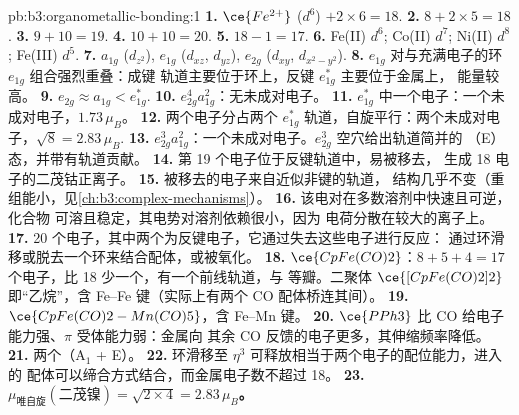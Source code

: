 \begin{solution}{pb:b3:organometallic-bonding:1}
\textbf{1.} $\ce{Fe^{2+}}$ ($d^6$) $+ 2 \times 6 = 18$.
\textbf{2.} $8 + 2 \times 5 = 18$.
\textbf{3.} $9 + 10 = 19$.
\textbf{4.} $10 + 10 = 20$.
\textbf{5.} $18 - 1 = 17$.
\textbf{6.} Fe(II) $d^6$; Co(II) $d^7$; Ni(II) $d^8$; Fe(III) $d^5$.
\textbf{7.} $a_{1g}$ ($d_{z^2}$), $e_{1g}$ ($d_{xz}$, $d_{yz}$), $e_{2g}$ ($d_{xy}$, $d_{x^2-y^2}$).
\textbf{8.} $e_{1g}$ 对与充满电子的环 $e_{1g}$ 组合强烈重叠：成键
轨道主要位于环上，反键 $e_{1g}^\ast$ 主要位于金属上，
能量较高。
\textbf{9.} $e_{2g} \approx a_{1g} < e_{1g}^\ast$.
\textbf{10.} $e_{2g}^4a_{1g}^2$：无未成对电子。
\textbf{11.} $e_{1g}^\ast$ 中一个电子：一个未成对电子，$1.73\,\mu_B$。
\textbf{12.} 两个电子分占两个 $e_{1g}^\ast$ 轨道，自旋平行：两个未成对电子，$\sqrt{8} =
2.83\,\mu_B$.
\textbf{13.} $e_{2g}^3a_{1g}^2$：一个未成对电子。$e_{2g}^3$ 空穴给出轨道简并的
（E）态，并带有轨道贡献。
\textbf{14.} 第 19 个电子位于反键轨道中，易被移去，
生成 18 电子的二茂钴正离子。
\textbf{15.} 被移去的电子来自近似非键的轨道，
结构几乎不变（重组能小，见\cref{ch:b3:complex-mechanisms}）。
\textbf{16.} 该电对在多数溶剂中快速且可逆，化合物
可溶且稳定，其电势对溶剂依赖很小，因为
电荷分散在较大的离子上。
\textbf{17.} 20 个电子，其中两个为反键电子，它通过失去这些电子进行反应：
通过环滑移或脱去一个环来结合配体，或被氧化。
\textbf{18.} $\ce{CpFe(CO)2}$：$8 + 5 + 4 = 17$ 个电子，比 18 少一个，有一个前线轨道，与
 等瓣。二聚体 $\ce{[CpFe(CO)2]2}$ 即“乙烷”，含 Fe--Fe 键（实际上有两个 CO
配体桥连其间）。
\textbf{19.} $\ce{CpFe(CO)2-Mn(CO)5}$，含 Fe--Mn 键。
\textbf{20.} $\ce{PPh3}$ 比 CO 给电子能力强、$\pi$ 受体能力弱：金属向
其余 CO 反馈的电子更多，其伸缩频率降低。
\textbf{21.} 两个（A$_1$ + E）。
\textbf{22.} 环滑移至 $\eta^3$ 可释放相当于两个电子的配位能力，进入的
配体可以缔合方式结合，而金属电子数不超过 18。
\textbf{23.} \textbf{$\mu_{\text{唯自旋}}(\text{二茂镍}) = \sqrt{2 \times 4} = 2.83\,\mu_B$。}
\end{solution}
